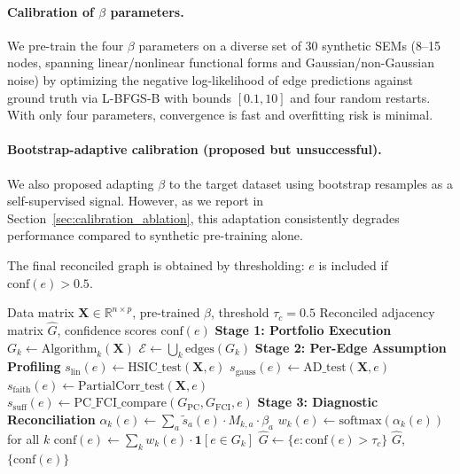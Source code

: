 \documentclass{article}
\newcommand{\adecd}{\textsc{ADECD}}
\newcommand{\conf}{\mathrm{conf}}
\begin{document}
\paragraph{Calibration of $\beta$ parameters.}
We pre-train the four $\beta$ parameters on a diverse set of 30 synthetic SEMs (8--15 nodes, spanning linear/nonlinear functional forms and Gaussian/non-Gaussian noise) by optimizing the negative log-likelihood of edge predictions against ground truth via L-BFGS-B with bounds $[0.1, 10]$ and four random restarts.
With only four parameters, convergence is fast and overfitting risk is minimal.

\paragraph{Bootstrap-adaptive calibration (proposed but unsuccessful).}
We also proposed adapting $\beta$ to the target dataset using bootstrap resamples as a self-supervised signal.
However, as we report in Section~\ref{sec:calibration_ablation}, this adaptation consistently degrades performance compared to synthetic pre-training alone.

The final reconciled graph is obtained by thresholding: $e$ is included if $\conf(e) > 0.5$.

\begin{algorithm}[t]
\caption{\adecd{}: Assumption-Diagnostic Ensemble Causal Discovery}
\label{alg:adecd}
\begin{algorithmic}[1]
\REQUIRE Data matrix $\mathbf{X} \in \mathbb{R}^{n \times p}$, pre-trained $\beta$, threshold $\tau_c = 0.5$
\ENSURE Reconciled adjacency matrix $\hat{G}$, confidence scores $\conf(e)$
\STATE \textbf{Stage 1: Portfolio Execution}
\STATE $G_k \leftarrow \text{Algorithm}_k(\mathbf{X})$ 
\ENDFOR
\STATE $\mathcal{E} \leftarrow \bigcup_k \text{edges}(G_k)$ 
\STATE \textbf{Stage 2: Per-Edge Assumption Profiling}
\STATE $s_{\mathrm{lin}}(e) \leftarrow \text{HSIC\_test}(\mathbf{X}, e)$ 
\STATE $s_{\mathrm{gauss}}(e) \leftarrow \text{AD\_test}(\mathbf{X}, e)$ 
\STATE $s_{\mathrm{faith}}(e) \leftarrow \text{PartialCorr\_test}(\mathbf{X}, e)$ 
\STATE $s_{\mathrm{suff}}(e) \leftarrow \text{PC\_FCI\_compare}(G_{\mathrm{PC}}, G_{\mathrm{FCI}}, e)$ 
\ENDFOR
\STATE \textbf{Stage 3: Diagnostic Reconciliation}
\STATE $\alpha_k(e) \leftarrow \sum_{a} \tilde{s}_a(e) \cdot M_{k,a} \cdot \beta_a$ 
\ENDFOR
\STATE $w_k(e) \leftarrow \text{softmax}(\alpha_k(e))$ for all $k$ 
\STATE $\conf(e) \leftarrow \sum_k w_k(e) \cdot \mathbf{1}[e \in G_k]$ 
\ENDFOR
\STATE $\hat{G} \leftarrow \{e : \conf(e) > \tau_c\}$
\RETURN $\hat{G}$, $\{\conf(e)\}$
\end{algorithmic}
\end{algorithm}
\end{document}

